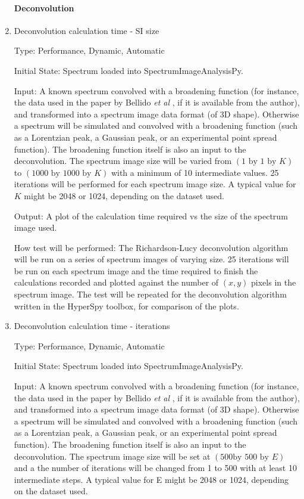\documentclass[12pt, titlepage]{article}
\newcommand{\progname}{SpectrumImageAnalysisPy}
\begin{document}
\begin{enumerate}

\paragraph{Deconvolution}
\item{Deconvolution calculation time - SI size}

Type: Performance, Dynamic, Automatic
					
Initial State: Spectrum loaded into \progname{}.

Input: A known spectrum convolved with a broadening function (for instance, the
data used in the paper by Bellido \textit{et al} \cite{bellido_toward_2014}, if
it is available from the author), and transformed into a spectrum image data
format (of 3D shape). Otherwise a spectrum will be simulated and convolved with
a broadening function (such as a Lorentzian peak, a Gaussian peak, or an
experimental point spread function). The broadening function itself is also an
input to the deconvolution. The spectrum image size will be varied from
$(1\text{ by }1\text{ by }K)$ to $(1000 \text{ by } 1000 \text{ by } K)$ with a
minimum of 10 intermediate values. 25 iterations will be performed for each
spectrum image size. A typical value for $K$ might be 2048 or 1024, depending on
the dataset used.

Output: A plot of the calculation time required vs the size of the spectrum
image used.

How test will be performed: The Richardson-Lucy deconvolution algorithm will be
run on a series of spectrum images of varying size. 25 iterations will be run on
each spectrum image and the time required to finish the calculations recorded
and plotted against the number of $(x, y)$ pixels in the spectrum image. The
test will be repeated for the deconvolution algorithm written in the HyperSpy
toolbox, for comparison of the plots.\\


\item{Deconvolution calculation time - iterations}

Type: Performance, Dynamic, Automatic

Initial State: Spectrum loaded into \progname{}.

Input: A known spectrum convolved with a broadening function (for instance, the
data used in the paper by Bellido \textit{et al} \cite{bellido_toward_2014}, if
it is available from the author), and transformed into a spectrum image data
format (of 3D shape). Otherwise a spectrum will be simulated and convolved with
a broadening function (such as a Lorentzian peak, a Gaussian peak, or an
experimental point spread function). The broadening function itself is also an
input to the deconvolution. The spectrum image size will be set at $(500 \text{
by } 500 \text{ by } E)$ and a the number of iterations will be changed from 1
to 500 with at least 10 intermediate steps. A typical value for E might be 2048
or 1024, depending on the dataset used.


\end{enumerate}
\end{document}
